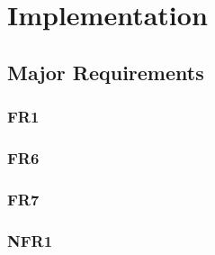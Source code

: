 
\chapter{Implementation}
\minitoc

\clearpage

\section{Major Requirements}\label{impl:Major Requirements}

\subsection{FR1}

\subsection{FR6}\label{subsec:FR6}

\subsection{FR7}\label{subsec:FR7}

\subsection{NFR1}
